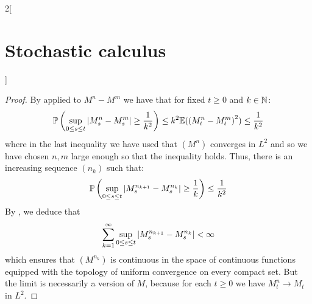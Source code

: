 \documentclass[../../../main_math.tex]{subfiles}
\begin{document}
\begin{multicols}{2}[\section{Stochastic calculus}]
\begin{proposition}
  \end{proposition}
  \begin{proof}
    By  applied to $M^n-M^m$ we have that for fixed $t\geq 0$ and $k\in\mathbb{N}$:
    $$
      \mathbb{P}\left(\sup_{0\leq s\leq t}\abs{M_s^n-M_s^m}\geq \frac{1}{k^2}\right)\leq k^2\mathbb{E}({(M_t^n-M_t^m)}^2)\leq \frac{1}{k^2}
    $$
    where in the last inequality we have used that ${(M^n)}$ converges in $L^2$ and so we have chosen $n,m$ large enough so that the inequality holds. Thus, there is an increasing sequence $(n_k)$ such that:
    $$
      \mathbb{P}\left(\sup_{0\leq s\leq t}\abs{M_s^{n_{k+1}}-M_s^{n_k}}\geq \frac{1}{k}\right)\leq \frac{1}{k^2}
    $$
    By , we deduce that
    $$
      \sum_{k=1}^{\infty}\sup_{0\leq s\leq t}\abs{M_s^{n_{k+1}}-M_s^{n_k}}<\infty
    $$
    which ensures that $(M^{n_k})$ is continuous in the space of continuous functions equipped with the topology of uniform convergence on every compact set. But the limit is necessarily a version of $M$, because for each $t\geq 0$ we have $M_t^n\to M_t$ in $L^2$.
  \end{proof}

\end{multicols}
\end{document}
